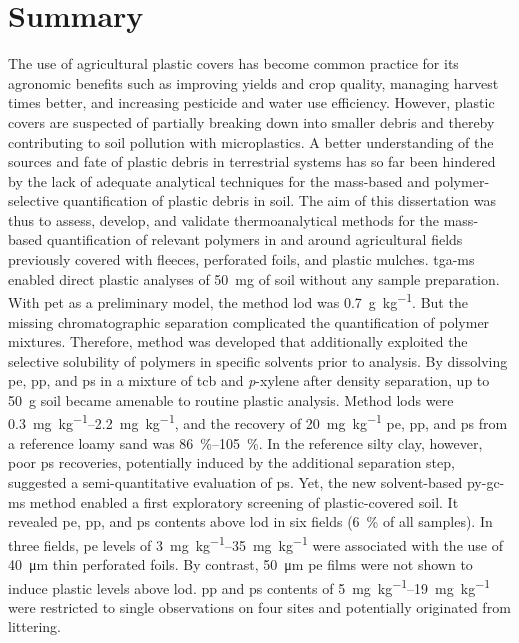 
\chapter{Summary}

The use of agricultural plastic covers has become common practice for its agronomic benefits such as improving yields and crop quality, managing harvest times better, and increasing pesticide and water use efficiency. However, plastic covers are suspected of partially breaking down into smaller debris and thereby contributing to soil pollution with microplastics.
A better understanding of the sources and fate of plastic debris in terrestrial systems has so far been hindered by the lack of adequate analytical techniques for the mass-based and polymer-selective quantification of plastic debris in soil. The aim of this dissertation was thus to assess, develop, and validate thermoanalytical methods for the mass-based quantification of relevant polymers in and around agricultural fields previously covered with fleeces, perforated foils, and plastic mulches.
\Ac{tga-ms} enabled direct plastic analyses of \SI{50}{\milli\gram} of soil without any sample preparation. With \ac{pet} as a preliminary model, the method \ac{lod} was \SI{0.7}{\gram\per\kilo\gram}. But the missing chromatographic separation complicated the quantification of polymer mixtures. Therefore,  method was developed that additionally exploited the selective solubility of polymers in specific solvents prior to analysis. By dissolving \ac{pe}, \ac{pp}, and \ac{ps} in a mixture of \acl{tcb} and \textit{p}-xylene after density separation, up to \SI{50}{\gram} soil became amenable to routine plastic analysis. Method \acp{lod} were \SIrange{0.3}{2.2}{\milli\gram\per\kilo\gram}, and the recovery of \SI{20}{\milli\gram\per\kilo\gram} \ac{pe}, \ac{pp}, and \ac{ps} from a reference loamy sand was \SIrange{86}{105}{\percent}. In the reference silty clay, however, poor \ac{ps} recoveries, potentially induced by the additional separation step, suggested a semi-quantitative evaluation of \ac{ps}.
Yet, the new solvent-based \ac{py-gc-ms} method enabled a first exploratory screening of plastic-covered soil. It revealed \ac{pe}, \ac{pp}, and \ac{ps} contents above \ac{lod} in six fields (\SI{6}{\percent} of all samples). In three fields, \ac{pe} levels of \SIrange{3}{35}{\milli\gram\per\kilo\gram} were associated with the use of \SI{40}{\micro\meter} thin perforated foils. By contrast, \SI{50}{\micro\meter} \ac{pe} films were not shown to induce plastic levels above \ac{lod}. \Ac{pp} and \ac{ps} contents of \SIrange{5}{19}{\milli\gram\per\kilo\gram} were restricted to single observations on four sites and potentially originated from littering. 
